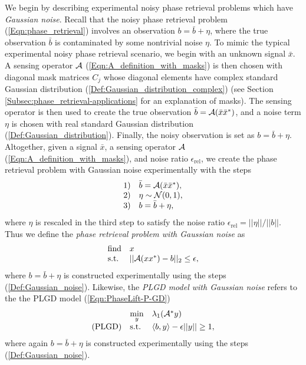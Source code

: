 \begin{enumerate}
We begin by describing experimental noisy phase retrieval problems which have \textit{Gaussian noise}.  Recall that the noisy phase retrieval problem (\ref{Eqn:phase_retrieval}) involves an observation $b = \bar{b} + \eta$, where the true observation $\bar{b}$ is contaminated by some nontrivial noise $\eta$.  To mimic the typical experimental noisy phase retrieval scenario, we begin with an unknown signal $\bar{x}$.  A sensing operator ${\mathcal A}$ (\ref{Eqn:A_definition_with_masks}) is then chosen with diagonal mask matrices $C_j$ whose diagonal elements have complex standard Gaussian distribution (\ref{Def:Gaussian_distribution_complex}) (see Section \ref{Subsec:phase_retrieval-applications} for an explanation of masks).  The sensing operator is then used to create the true observation $\bar{b} = {\mathcal A}(\bar{x}\bar{x}^*)$, and a noise term $\eta$ is chosen with real standard Gaussian distribution (\ref{Def:Gaussian_distribution}).  Finally, the noisy observation is set as $b = \bar{b} + \eta$.  Altogether, given a signal $\bar{x}$, a sensing operator ${\mathcal A}$ (\ref{Eqn:A_definition_with_masks}), and noise ratio $\epsilon_\text{rel}$, we create the phase retrieval problem with Gaussian noise experimentally with the steps
\begin{equation} 			\label{Def:Gaussian_noise}
\begin{array}{ll}
1)	&	\bar{b} = {\mathcal A}(\bar{x}\bar{x}^*) ,\\
2) &	\eta \sim {\mathcal N}(0,1), \\
3) & b = \bar{b} + \eta,
\end{array}
\end{equation}
where $\eta$ is rescaled in the third step to satisfy the noise ratio $\epsilon_\text{rel} = ||\eta|| / ||b||$.  Thus we define the \textit{phase retrieval problem with Gaussian noise} as
\begin{equation} \label{Eqn:phase_retrieval_Gaussian_noise}
\begin{array}{ll}
		\text{find}
		&	x
			\\
		\textnormal{s.t.}
		& 	||{\mathcal A} (xx^*) - b||_2 \leq \epsilon,
\end{array}
\end{equation}
where $b = \bar{b} + \eta$ is constructed experimentally using the steps (\ref{Def:Gaussian_noise}).  Likewise, the \textit{PLGD model with Gaussian noise} refers to the the PLGD model (\ref{Eqn:PhaseLift-P-GD}) 
\begin{equation} 			\label{Eqn:PhaseLift-GD_Gaussian_noise}
\begin{array}{lll}
	&\min\limits_{\substack{y}}
					&	\lambda_1({\mathcal A}^* y)
						\\
	\textnormal{(PLGD)}
				&	\textnormal{s.t.}
					&	\langle b, y \rangle - \epsilon ||y|| \geq 1,
\end{array}
\end{equation}
where again $b = \bar{b} + \eta$ is constructed experimentally using the steps (\ref{Def:Gaussian_noise}).  



\end{enumerate}
